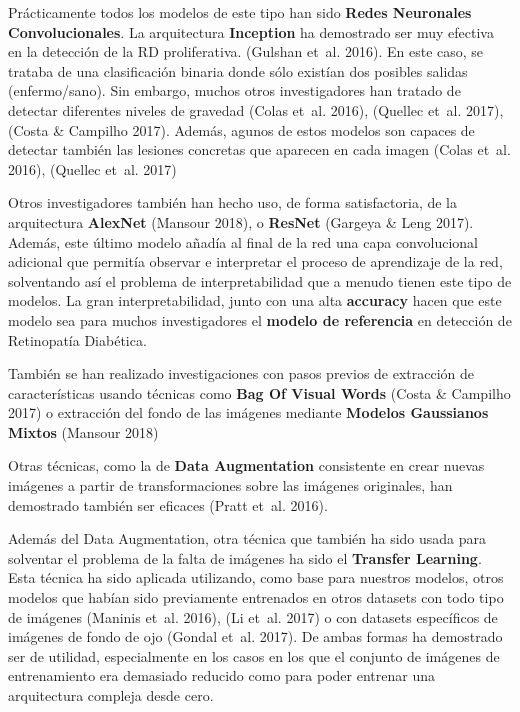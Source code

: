 \documentclass[
  12pt,
  spanish,
  a4paperpaper,
]{report}
\begin{document}
Prácticamente todos los modelos de este tipo han sido \textbf{Redes
Neuronales Convolucionales}. La arquitectura \textbf{Inception} ha
demostrado ser muy efectiva en la detección de la RD proliferativa.
(Gulshan et~al. 2016). En este caso, se trataba de una clasificación
binaria donde sólo existían dos posibles salidas (enfermo/sano). Sin
embargo, muchos otros investigadores han tratado de detectar diferentes
niveles de gravedad (Colas et~al. 2016), (Quellec et~al. 2017), (Costa
\& Campilho 2017). Además, agunos de estos modelos son capaces de
detectar también las lesiones concretas que aparecen en cada imagen
(Colas et~al. 2016), (Quellec et~al. 2017)

Otros investigadores también han hecho uso, de forma satisfactoria, de
la arquitectura \textbf{AlexNet} (Mansour 2018), o \textbf{ResNet}
(Gargeya \& Leng 2017). Además, este último modelo añadía al final de la
red una capa convolucional adicional que permitía observar e interpretar
el proceso de aprendizaje de la red, solventando así el problema de
interpretabilidad que a menudo tienen este tipo de modelos. La gran
interpretabilidad, junto con una alta \textbf{accuracy} hacen que este
modelo sea para muchos investigadores el \textbf{modelo de referencia}
en detección de Retinopatía Diabética.

También se han realizado investigaciones con pasos previos de extracción
de características usando técnicas como \textbf{Bag Of Visual Words}
(Costa \& Campilho 2017) o extracción del fondo de las imágenes mediante
\textbf{Modelos Gaussianos Mixtos} (Mansour 2018)

Otras técnicas, como la de \textbf{Data Augmentation} consistente en
crear nuevas imágenes a partir de transformaciones sobre las imágenes
originales, han demostrado también ser eficaces (Pratt et~al. 2016).

Además del Data Augmentation, otra técnica que también ha sido usada
para solventar el problema de la falta de imágenes ha sido el
\textbf{Transfer Learning}. Esta técnica ha sido aplicada utilizando,
como base para nuestros modelos, otros modelos que habían sido
previamente entrenados en otros datasets con todo tipo de imágenes
(Maninis et~al. 2016), (Li et~al. 2017) o con datasets específicos de
imágenes de fondo de ojo (Gondal et~al. 2017). De ambas formas ha
demostrado ser de utilidad, especialmente en los casos en los que el
conjunto de imágenes de entrenamiento era demasiado reducido como para
poder entrenar una arquitectura compleja desde cero.
\end{document}
